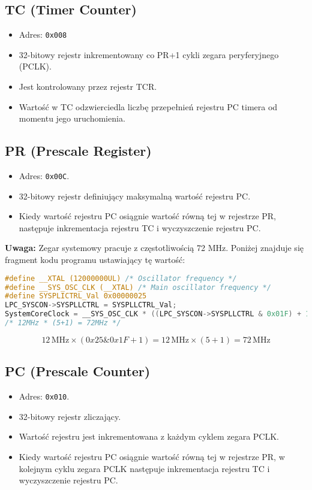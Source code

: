 \documentclass[a4paper,12pt]{report}
\begin{document}
\subsection{TC (Timer Counter)}
\begin{itemize}
    \item Adres: \texttt{0x008}
    \item 32-bitowy rejestr inkrementowany co PR+1 cykli zegara peryferyjnego (PCLK).
    \item Jest kontrolowany przez rejestr TCR.
    \item Wartość w TC odzwierciedla liczbę przepełnień rejestru PC timera od momentu jego uruchomienia.
\end{itemize}

\subsection{PR (Prescale Register)}
\begin{itemize}
    \item Adres: \texttt{0x00C}.
    \item 32-bitowy rejestr definiujący maksymalną wartość rejestru PC.
    \item Kiedy wartość rejestru PC osiągnie wartość równą tej w rejestrze PR, następuje inkrementacja rejestru TC i wyczyszczenie rejestru PC.
\end{itemize}

\textbf{Uwaga:} Zegar systemowy pracuje z częstotliwością 72 MHz. Poniżej znajduje się fragment kodu programu ustawiający tę wartość:
\begin{lstlisting}[language=C]
#define __XTAL (12000000UL) /* Oscillator frequency */
#define __SYS_OSC_CLK (__XTAL) /* Main oscillator frequency */
#define SYSPLICTRL_Val 0x00000025
LPC_SYSCON->SYSPLLCTRL = SYSPLLCTRL_Val;
SystemCoreClock = __SYS_OSC_CLK * ((LPC_SYSCON->SYSPLLCTRL & 0x01F) + 1);
/* 12MHz * (5+1) = 72MHz */
\end{lstlisting}

\[
12\,\mathrm{MHz} \times (0x25 \& 0x1F + 1) = 12\,\mathrm{MHz} \times (5+1) = 72\,\mathrm{MHz}
\]

\subsection{PC (Prescale Counter)}
\begin{itemize}
    \item Adres: \texttt{0x010}.
    \item 32-bitowy rejestr zliczający.
    \item Wartość rejestru jest inkrementowana z każdym cyklem zegara PCLK.
    \item Kiedy wartość rejestru PC osiągnie wartość równą tej w rejestrze PR, w kolejnym cyklu zegara PCLK następuje inkrementacja rejestru TC i wyczyszczenie rejestru PC.
\end{itemize}
\end{document}
